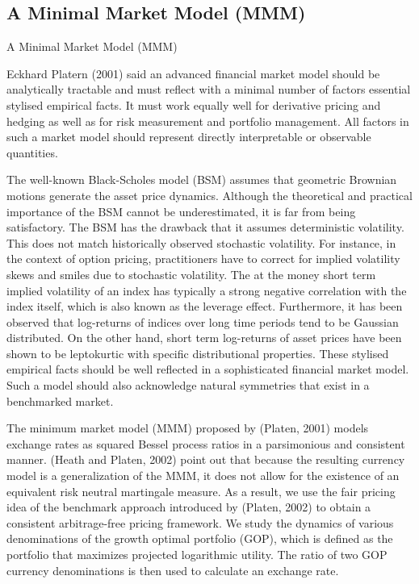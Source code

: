 \documentclass[unknownkeysallowed, compress]{beamer}
\theoremstyle{plain}
\begin{document}
\subsection{A Minimal Market Model (MMM)}
\begin{frame}[allowframebreaks]{A Minimal Market Model (MMM)}
\noindent
\par Eckhard Platern (2001) said an advanced financial market model should be analytically
tractable and must reflect with a minimal number of factors essential stylised empirical
facts. It must work equally well for derivative pricing and hedging as well as for risk
measurement and portfolio management. All factors in such a market model should
represent directly interpretable or observable quantities.\\
\par The well-known Black-Scholes model (BSM) assumes that geometric Brownian
motions generate the asset price dynamics. Although the theoretical and practical
importance of the BSM cannot be underestimated, it is far from being satisfactory. The
BSM has the drawback that it assumes deterministic volatility. This does not match
historically observed stochastic volatility. For instance, in the context of option pricing,
practitioners have to correct for implied volatility skews and smiles due to stochastic
volatility. The at the money short term implied volatility of an index has typically a strong
negative correlation with the index itself, which is also known as the leverage effect.
Furthermore, it has been observed that log-returns of indices over long time periods tend
to be Gaussian distributed. On the other hand, short term log-returns of asset prices have
been shown to be leptokurtic with specific distributional properties. These stylised
empirical facts should be well reflected in a sophisticated financial market model. Such a
model should also acknowledge natural symmetries that exist in a benchmarked market.\\
\par The minimum market model (MMM) proposed by (Platen, 2001) models exchange
rates as squared Bessel process ratios in a parsimonious and consistent manner. (Heath
and Platen, 2002) point out that because the resulting currency model is a generalization
of the MMM, it does not allow for the existence of an equivalent risk neutral martingale
measure. As a result, we use the fair pricing idea of the benchmark approach introduced
by (Platen, 2002) to obtain a consistent arbitrage-free pricing framework. We study the
dynamics of various denominations of the growth optimal portfolio (GOP), which is
defined as the portfolio that maximizes projected logarithmic utility. The ratio of two
GOP currency denominations is then used to calculate an exchange rate.

\end{frame}
\end{document}
